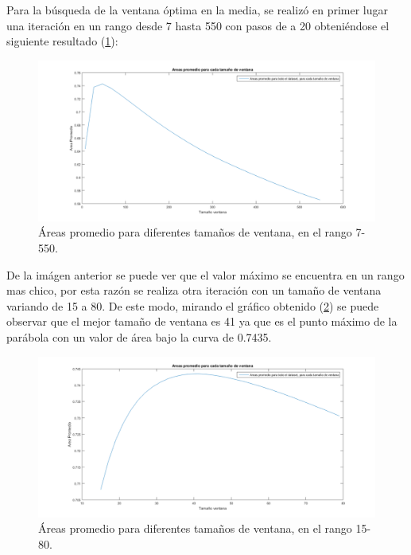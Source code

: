 Para la b\'usqueda de la ventana \'optima en la media, se realiz\'o en primer lugar una iteraci\'on en un rango desde 7 hasta 550 con pasos de a 20 obteni\'endose el siguiente resultado (\ref{fig:MediaRangoGrande}):

\begin{figure}[H]
	{
	\centering
	\includegraphics[width=1\textwidth]{Figures/MediaRangoGrande}
	\caption[Ventana Media 7-550]{\'Areas promedio para diferentes tama\~nos de ventana, en el rango 7-550.}
	\label{fig:MediaRangoGrande}
	}
\end{figure}

De la im\'agen anterior se puede ver que el valor m\'aximo se encuentra en un rango mas chico, por esta  raz\'on se realiza otra iteraci\'on con un tama\~no de ventana variando de 15 a 80. De este modo, mirando el gr\'afico obtenido  (\ref{fig:MediaRangoChico}) se puede observar que  el mejor tama\~no de ventana es 41 ya que es el punto m\'aximo de la par\'abola con un valor de \'area bajo la curva de 0.7435.

\begin{figure}[H]
	{
	\centering
	\includegraphics[width=1\textwidth]{Figures/MediaRangoChico}
	\caption[Ventana Media 15-80]{\'Areas promedio para diferentes tama\~nos de ventana, en el rango 15-80.}
	\label{fig:MediaRangoChico}
	}
\end{figure}

